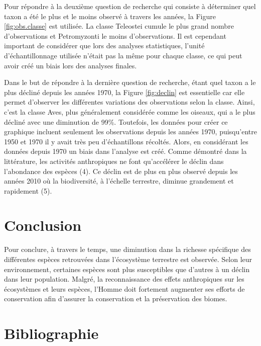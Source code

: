 \documentclass[9pt,twocolumn,twoside,]{pnas-new}
\begin{document}
Pour répondre à la deuxième question de recherche qui consiste à
déterminer quel taxon a été le plus et le moins observé à travers les
années, la Figure \ref{fig:obs.classe} est utilisée. La classe Teleostei
cumule le plus grand nombre d'observations et Petromyzonti le moins
d'observations. Il est cependant important de considérer que lors des
analyses statistiques, l'unité d'échantillonnage utilisée n'était pas la
même pour chaque classe, ce qui peut avoir créé un biais lors des
analyses finales.

Dans le but de répondre à la dernière question de recherche, étant quel
taxon a le plus décliné depuis les années 1970, la Figure
\ref{fig:declin} est essentielle car elle permet d'observer les
différentes variations des observations selon la classe. Ainsi, c'est la
classe Aves, plus généralement considérée comme les oiseaux, qui a le
plus décliné avec une diminution de 99\%. Toutefois, les données pour
créer ce graphique incluent seulement les observations depuis les années
1970, puisqu'entre 1950 et 1970 il y avait très peu d'échantillons
récoltés. Alors, en considérant les données depuis 1970 un biais dans
l'analyse est créé. Comme démontré dans la littérature, les activités
anthropiques ne font qu'accélérer le déclin dans l'abondance des espèces
(4). Ce déclin est de plus en plus observé depuis les années 2010 où la
biodiversité, à l'échelle terrestre, diminue grandement et rapidement
(5).

\section{Conclusion}\label{conclusion}

Pour conclure, à travers le temps, une diminution dans la richesse
spécifique des différentes espèces retrouvées dans l'écosystème
terrestre est observée. Selon leur environnement, certaines espèces sont
plus susceptibles que d'autres à un déclin dans leur population. Malgré,
la reconnaissance des effets anthropiques sur les écosystèmes et leurs
espèces, l'Homme doit fortement augmenter ses efforts de conservation
afin d'assurer la conservation et la préservation des biomes.

\section*{Bibliographie}\label{bibliographie}

\pnasbreak
\end{document}

